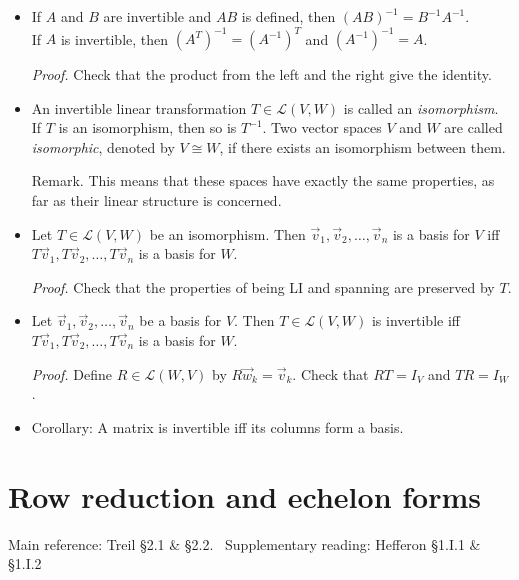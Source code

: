 \documentclass[11pt]{article}
\newcommand{\1}{\mathbf{1}}
\newcommand{\0}{\mathbf{0}}
\newcommand{\cL}{\mathcal{L}}
\newcommand{\vv}{\vec{v}}
\newcommand{\vw}{\vec{w}}
\begin{document}
\begin{itemize}
\item

If $A$ and $B$ are invertible and $AB$ is defined, then $(AB)^{-1} = B^{-1} A^{-1}$.
\\
If $A$ is invertible, then $(A^T)^{-1} = (A^{-1})^T$ and $(A^{-1})^{-1}=A$.

\emph{Proof.}
Check that the product from the left and the right give the identity.

\item

An invertible linear transformation $T \in \cL(V,W)$ is called an \emph{isomorphism}.
If $T$ is an isomorphism, then so is $T^{-1}$.
Two vector spaces $V$ and $W$ are called \emph{isomorphic}, denoted by $V \cong W$, if there exists an isomorphism between them.

Remark.
This means that these spaces have exactly the same properties, as far as their linear structure is concerned.

\item

Let $T \in \cL(V,W)$ be an isomorphism.
Then $\vv_1,\vv_2,\dots,\vv_n$ is a basis for $V$ iff $T\vv_1,T\vv_2,\dots,T\vv_n$ is a basis for $W$.

\emph{Proof.}
Check that the properties of being LI and spanning are preserved by $T$.

\item

Let $\vv_1,\vv_2,\dots,\vv_n$ be a basis for $V$.
Then $T \in \cL(V,W)$ is invertible iff $T\vv_1,T\vv_2,\dots,T\vv_n$ is a basis for $W$.

\emph{Proof.}
Define $R \in \cL(W,V)$ by $R \vw_k = \vv_k$.
Check that $RT = I_V$ and $TR = I_W$.

\item
Corollary: A matrix is invertible iff its columns form a basis.

\end{itemize}


\clearpage
\section{Row reduction and echelon forms}

Main reference:
Treil \S2.1 \& \S2.2.
\
Supplementary reading:
Hefferon \S 1.I.1 \& \S1.I.2
\end{document}
